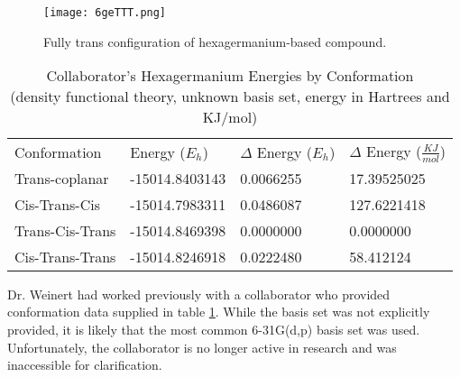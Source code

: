 \begin{figure}
	
	\centering
	
	\texttt{[image: 6geTTT.png]}
	
	\caption{Fully trans configuration of hexagermanium-based compound.}
	
	\label{fig:Ge6TransAll}
	
\end{figure}
\begin{table}[]
	
	\centering
	\begin{tabular}{llll}
		Conformation & Energy ($E_{h}$)    & $\Delta$ Energy ($E_{h}$) & $\Delta$ Energy ($\frac{KJ}{mol}$) \\ \cline{1-4} 
		Trans-coplanar        & -15014.8403143 & 0.0066255            & 17.39525025                        \\
		Cis-Trans-Cis         & -15014.7983311 & 0.0486087            & 127.6221418                        \\
		Trans-Cis-Trans       & -15014.8469398 & 0.0000000            & 0.0000000                                  \\
		Cis-Trans-Trans       & -15014.8246918 & 0.0222480            & 58.412124                         
	\end{tabular}
	\caption{Collaborator's Hexagermanium Energies by Conformation \\ (density functional theory, unknown basis set, energy in Hartrees and KJ/mol)}
	
	\label{tab:Ge6CollabEnergies}
	
\end{table}
Dr. Weinert had worked previously with a collaborator who provided conformation data supplied in table \ref{tab:Ge6CollabEnergies}.
While the basis set was not explicitly provided, it is likely that the most common 6-31G(d,p) basis set was used. 
Unfortunately, the collaborator is no longer active in research and was inaccessible for clarification.

